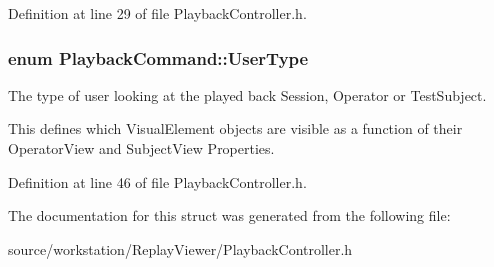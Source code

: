 Definition at line 29 of file Playback\-Controller.\-h.

\hypertarget{struct_playback_command_a63cad2fec38e9515df367a1575fcf6ff}{
\subsubsection[{User\-Type}]{\setlength{\rightskip}{0pt plus 5cm}enum {\bf Playback\-Command\-::\-User\-Type}}}\label{struct_playback_command_a63cad2fec38e9515df367a1575fcf6ff}
The type of user looking at the played back Session, Operator or Test\-Subject.

This defines which Visual\-Element objects are visible as a function of their Operator\-View and Subject\-View Properties. 

Definition at line 46 of file Playback\-Controller.\-h.



The documentation for this struct was generated from the following file\-:\begin{DoxyCompactItemize}
\item 
source/workstation/\-Replay\-Viewer/Playback\-Controller.\-h\end{DoxyCompactItemize}
